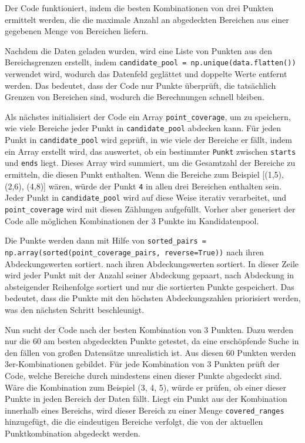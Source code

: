 Der Code funktioniert, indem die besten Kombinationen von drei Punkten ermittelt werden, die die maximale Anzahl an abgedeckten Bereichen aus einer gegebenen Menge von Bereichen liefern.

Nachdem die Daten geladen wurden, wird eine Liste von Punkten aus den Bereichsgrenzen erstellt, indem \texttt{candidate\_pool = np.unique(data.flatten())} verwendet wird, wodurch das Datenfeld geglättet und doppelte Werte entfernt werden. Das bedeutet, dass der Code nur Punkte überprüft, die tatsächlich Grenzen von Bereichen sind, wodurch die Berechnungen schnell bleiben.

Als nächstes initialisiert der Code ein Array \texttt{point\_coverage}, um zu speichern, wie viele Bereiche jeder Punkt in \texttt{candidate\_pool} abdecken kann. Für jeden Punkt in \texttt{candidate\_pool} wird geprüft, in wie viele der Bereiche er fällt, indem ein Array erstellt wird, das auswertet, ob ein bestimmter \texttt{Punkt} zwischen \texttt{starts} und \texttt{ends} liegt. Dieses Array wird summiert, um die Gesamtzahl der Bereiche zu ermitteln, die diesen Punkt enthalten. Wenn die Bereiche zum Beispiel [(1,5), (2,6), (4,8)] wären, würde der Punkt \texttt{4} in allen drei Bereichen enthalten sein. Jeder Punkt in \texttt{candidate\_pool} wird auf diese Weise iterativ verarbeitet, und \texttt{point\_coverage} wird mit diesen Zählungen aufgefüllt. Vorher aber generiert der Code alle möglichen Kombinationen der 3 Punkte im Kandidatenpool.

Die Punkte werden dann mit Hilfe von \texttt{sorted\_pairs = np.array(sorted(point\_coverage\_pairs, reverse=True))} nach ihren Abdeckungswerten sortiert.  nach ihren Abdeckungswerten sortiert. In dieser Zeile wird jeder Punkt mit der Anzahl seiner Abdeckung gepaart, nach Abdeckung in absteigender Reihenfolge sortiert und nur die sortierten Punkte gespeichert. Das bedeutet, dass die Punkte mit den höchsten Abdeckungszahlen priorisiert werden, was den nächsten Schritt beschleunigt.

Nun sucht der Code nach der besten Kombination von 3 Punkten. Dazu werden nur die 60 am besten abgedeckten Punkte getestet, da eine erschöpfende Suche in den fällen von großen Datensätze unrealistich ist. Aus diesen 60 Punkten werden 3er-Kombinationen gebildet. Für jede Kombination von 3 Punkten prüft der Code, welche Bereiche durch mindestens einen dieser Punkte abgedeckt sind. Wäre die Kombination zum Beispiel (3, 4, 5), würde er prüfen, ob einer dieser Punkte in jeden Bereich der Daten fällt. Liegt ein Punkt aus der Kombination innerhalb eines Bereichs, wird dieser Bereich zu einer Menge \texttt{covered\_ranges} hinzugefügt, die die eindeutigen Bereiche verfolgt, die von der aktuellen Punktkombination abgedeckt werden.

